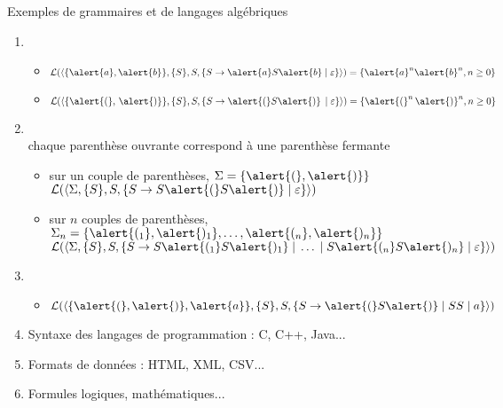 
\begingroup

\begin{frame}{Exemples de grammaires et de langages algébriques}
  \begin{enumerate}
  \item {}\\
    \begin{itemize}
    \item $\mathcal{L}(\langle\{\alert{a}, \alert{b}\},\{S\},S,\{S \rightarrow \alert{a}S\alert{b} \;|\; \varepsilon\}\rangle) = \{\alert{a}^n\alert{b}^n, n\geq 0\}$\\
    \item $\mathcal{L}(\langle\{\alert{(}, \, \alert{)}\},\{S\},S,\{S \rightarrow \alert{(}S\alert{)}\, \;|\;\varepsilon \}\rangle) = \{\alert{(}^n\, \alert{)}^n, n\geq 0\}$
    \end{itemize}
  \item {}\\
    chaque parenthèse ouvrante correspond à une parenthèse fermante
    \begin{itemize}
    \item sur un couple de parenthèses, $\Sigma = \{\alert{(}, \alert{)}\}$\\
      $\mathcal{L}(\langle \Sigma ,\{S\},S,\{S \rightarrow S\alert{(}S\alert{)} \;|\; \varepsilon \}\rangle)$
    \item sur $n$ couples de parenthèses, $\Sigma_n = \{\alert{(_1}, \alert{)_1}, \ldots, \alert{(_n}, \alert{)_n}\}$\\
      $\mathcal{L}(\langle \Sigma ,\{S\},S,\{S \rightarrow S\alert{(_1}S\alert{)_1} \;|\; \ldots \;|\;S\alert{(_n}S\alert{)_n} \;|\; \varepsilon \}\rangle)$
    \end{itemize}
  \item {}\\
    \begin{itemize}
    \item $\mathcal{L}(\langle \{\alert{(}, \alert{)}, \alert{a}\} ,\{S\},S,\{S \rightarrow \alert{(}S\alert{)} \;|\; SS \;|\; a\}\rangle)$
    \end{itemize}
  \item Syntaxe des langages de programmation : C, C++, Java...
  \item Formats de données : HTML, XML, CSV...
  \item Formules logiques, mathématiques...
  \end{enumerate}
\end{frame}
\endgroup
